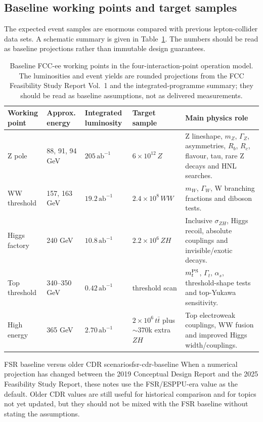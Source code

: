 \documentclass[11pt,a4paper]{article}
\newcommand{\ab}{\mathrm{ab}}
\newcommand{\mZ}{m_Z}
\newcommand{\gZ}{\Gamma_Z}
\newcommand{\mW}{m_W}
\newcommand{\gW}{\Gamma_W}
\newcommand{\mt}{m_t}
\newcommand{\Gt}{\Gamma_t}
\newcommand{\als}{\alpha_s}
\numberwithin{equation}{section}
\begin{document}
\subsection{Baseline working points and target samples}
The expected event samples are enormous compared with previous lepton-collider data sets. A schematic summary is given in Table~\ref{tab:run-plan}. The numbers should be read as baseline projections rather than immutable design guarantees.
\begin{table}[H]
\centering
\small
\caption{Baseline FCC-ee working points in the four-interaction-point operation model. The luminosities and event yields are rounded projections from the FCC Feasibility Study Report Vol.~1 and the integrated-programme summary; they should be read as baseline assumptions, not as delivered measurements.}
\label{tab:run-plan}
\begin{tabularx}{\textwidth}{@{}p{2.35cm}p{2.0cm}p{2.35cm}p{2.15cm}X@{}}
\toprule
Working point & Approx. energy & Integrated luminosity & Target sample & Main physics role \\
\midrule
Z pole & 88, 91, 94 GeV & \(205\,\ab^{-1}\) & \(6\times10^{12}\,Z\) & Z lineshape, \(\mZ\), \(\gZ\), asymmetries, \(R_b\), \(R_c\), flavour, tau, rare Z decays and HNL searches.\\
WW threshold & 157, 163 GeV & \(19.2\,\ab^{-1}\) & \(2.4\times10^8\,WW\) & \(\mW\), \(\gW\), W branching fractions and diboson tests.\\
Higgs factory & 240 GeV & \(10.8\,\ab^{-1}\) & \(2.2\times10^6\,ZH\) & Inclusive \(\sigma_{ZH}\), Higgs recoil, absolute couplings and invisible/exotic decays.\\
Top threshold & 340--350 GeV & \(0.42\,\ab^{-1}\) & threshold scan & \(\mt^{\rm PS}\), \(\Gt\), \(\als\), threshold-shape tests and top-Yukawa sensitivity.\\
High energy & 365 GeV & \(2.70\,\ab^{-1}\) & \(2\times10^6\,t\bar t\) plus \(\sim370\)k extra \(ZH\) & Top electroweak couplings, WW fusion and improved Higgs width/couplings.\\
\bottomrule
\end{tabularx}
\end{table}

\begin{remarkbox}{FSR baseline versus older CDR scenarios}{fsr-cdr-baseline}
When a numerical projection has changed between the 2019 Conceptual Design Report and the 2025 Feasibility Study Report, these notes use the FSR/ESPPU-era value as the default. Older CDR values are still useful for historical comparison and for topics not yet updated, but they should not be mixed with the FSR baseline without stating the assumptions.
\end{remarkbox}
\end{document}
